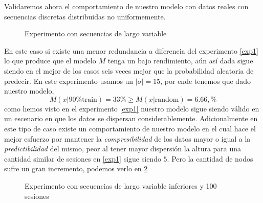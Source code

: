 	Validaremos ahora el comportamiento de nuestro modelo con datos reales con secuencias discretas distribuidas no uniformemente.
	
	
	
	\begin{figure}[h] 
		\centering
		\caption{Experimento con secuencias de largo variable}
		\label{fig:experimento2}
	\end{figure}
	
			
	En este caso si existe una menor redundancia a diferencia del experimento \ref{exp1} lo que produce que el modelo $M$ tenga un bajo rendimiento, aún así dada sigue siendo en el mejor de los casos seis veces mejor que la probabilidad aleatoria de predecir. En este experimento usamos un $|\sigma| =15$, por ende tenemos que dado nuestro modelo,
	\begin{equation}\label{expResult2}
		M( x | \mbox{90\% train}  ) = 33 \% \geq M( x | \mbox{random}  ) = 6.66 ,\% 
	\end{equation} como hemos visto en el experimento \ref{exp1} nuestro modelo sigue siendo válido en un escenario en que los datos se dispersan considerablemente. 
	Adicionalmente en este tipo de caso existe un comportamiento de nuestro modelo en el cual hace el mejor esfuerzo por mantener la \emph{compresibilidad} de los datos mayor o igual a la \emph{predictibilidad} del mismo, peor al tener mayor dispersión la altura para una cantidad similar de sesiones en \ref{exp1} sigue siendo $5$. Pero la cantidad de nodos sufre un gran incremento, podemos verlo en \ref{fig:exp-largo-variable-inf}
	
	
	
	\begin{figure}[h] 
		\centering
		
		\caption{Experimento con secuencias de largo variable inferiores y 100 sesiones}
		\label{fig:exp-largo-variable-inf}
	\end{figure}
	
